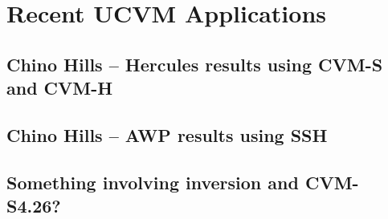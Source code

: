 
\section{Recent UCVM Applications}
\subsection{Chino Hills -- Hercules results using CVM-S and CVM-H}
\subsection{Chino Hills -- AWP results using SSH}
\subsection{Something involving inversion and CVM-S4.26?}
